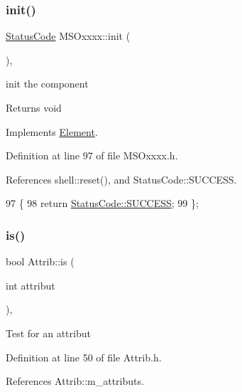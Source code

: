 \subsubsection{\texorpdfstring{init()}{init()}}
{\footnotesize\ttfamily \hyperlink{classStatusCode}{Status\+Code} M\+S\+Oxxxx\+::init (\begin{DoxyParamCaption}{ }\end{DoxyParamCaption})\hspace{0.3cm}{\ttfamily [inline]}, {\ttfamily [virtual]}}

init the component

\begin{DoxyReturn}{Returns}
void 
\end{DoxyReturn}


Implements \hyperlink{classElement_af42754b5cabc198869222725218d695c}{Element}.



Definition at line 97 of file M\+S\+Oxxxx.\+h.



References shell\+::reset(), and Status\+Code\+::\+S\+U\+C\+C\+E\+SS.


\begin{DoxyCode}
97                     \{
98     \textcolor{keywordflow}{return} \hyperlink{classStatusCode_a6f565cbeadc76d14c72f047e5e85eb4badd0da38d3ba0d922efd1f4619bc37ad8}{StatusCode::SUCCESS};
99   \};
\end{DoxyCode}
\mbox{\label{classAttrib_a704f26af560909ad22065083bb7d4c34}} 
\subsubsection{\texorpdfstring{is()}{is()}}
{\footnotesize\ttfamily bool Attrib\+::is (\begin{DoxyParamCaption}\item[{int}]{attribut }\end{DoxyParamCaption})\hspace{0.3cm}{\ttfamily [inline]}, {\ttfamily [inherited]}}

Test for an attribut 

Definition at line 50 of file Attrib.\+h.



References Attrib\+::m\+\_\+attributs.



